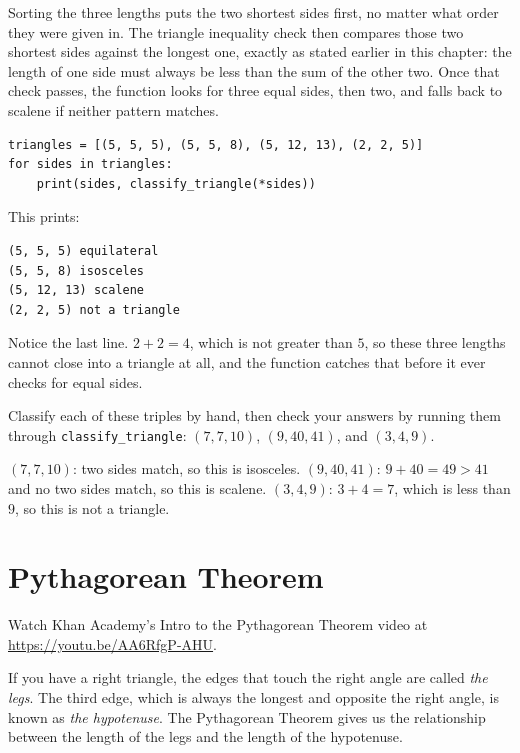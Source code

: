 Sorting the three lengths puts the two shortest sides first, no matter what order they were given in. The triangle inequality check then compares those two shortest sides against the longest one, exactly as stated earlier in this chapter: the length of one side must always be less than the sum of the other two. Once that check passes, the function looks for three equal sides, then two, and falls back to scalene if neither pattern matches.

\begin{verbatim}
triangles = [(5, 5, 5), (5, 5, 8), (5, 12, 13), (2, 2, 5)]
for sides in triangles:
    print(sides, classify_triangle(*sides))
\end{verbatim}

This prints:

\begin{verbatim}
(5, 5, 5) equilateral
(5, 5, 8) isosceles
(5, 12, 13) scalene
(2, 2, 5) not a triangle
\end{verbatim}

Notice the last line. $2 + 2 = 4$, which is not greater than $5$, so these three lengths cannot close into a triangle at all, and the function catches that before it ever checks for equal sides.

\begin{Exercise}[title={Classifying Triangles}, label=classify_triangle_sides]
Classify each of these triples by hand, then check your answers by running them through \texttt{classify_triangle}: $(7, 7, 10)$, $(9, 40, 41)$, and $(3, 4, 9)$.
\end{Exercise}
\begin{Answer}[ref=classify_triangle_sides]
$(7, 7, 10)$: two sides match, so this is isosceles. $(9, 40, 41)$: $9 + 40 = 49 > 41$ and no two sides match, so this is scalene. $(3, 4, 9)$: $3 + 4 = 7$, which is less than $9$, so this is not a triangle.
\end{Answer}


\section{Pythagorean Theorem}
Watch Khan Academy's Intro to the Pythagorean Theorem video at \url{https://youtu.be/AA6RfgP-AHU}.

If you have a right triangle, the edges that touch the right angle are
called \emph{the legs}.  The third edge, which is always the longest and opposite the right angle,
is known as \emph{the hypotenuse}. The Pythagorean Theorem gives us
the relationship between the length of the legs and the length of the
hypotenuse.

